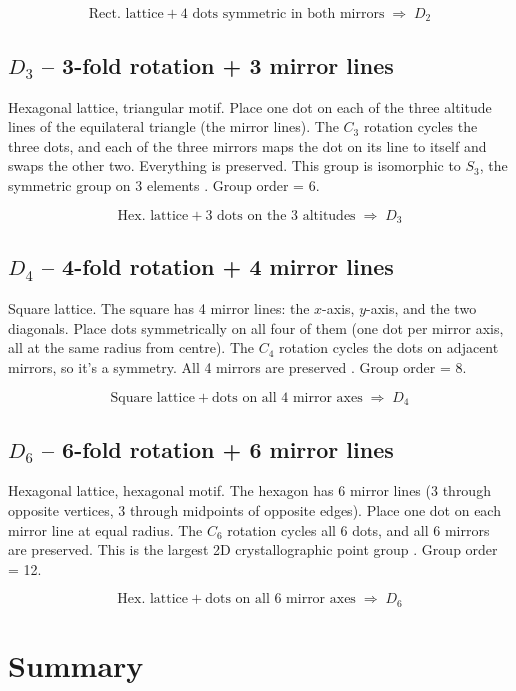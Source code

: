 \documentclass[12pt,a4paper]{article}
\begin{document}
\[
\boxed{\text{Rect. lattice} + \text{4 dots symmetric in both mirrors} \;\Rightarrow\; D_2}
\]

\subsection*{$D_3$ -- 3-fold rotation + 3 mirror lines}

Hexagonal lattice, triangular motif. Place one dot on each of the three altitude lines
of the equilateral triangle (the mirror lines). The $C_3$ rotation cycles the three
dots, and each of the three mirrors maps the dot on its line to itself and swaps the
other two. Everything is preserved. This group is isomorphic to $S_3$, the symmetric
group on 3 elements \cite{Burns1990, Bradley1972}. Group order = 6.

\[
\boxed{\text{Hex. lattice} + \text{3 dots on the 3 altitudes} \;\Rightarrow\; D_3}
\]

\subsection*{$D_4$ -- 4-fold rotation + 4 mirror lines}

Square lattice. The square has 4 mirror lines: the $x$-axis, $y$-axis, and the two
diagonals. Place dots symmetrically on all four of them (one dot per mirror axis,
all at the same radius from centre). The $C_4$ rotation cycles the dots on adjacent
mirrors, so it's a symmetry. All 4 mirrors are preserved \cite{Ashcroft1976}. Group order = 8.

\[
\boxed{\text{Square lattice} + \text{dots on all 4 mirror axes} \;\Rightarrow\; D_4}
\]

\subsection*{$D_6$ -- 6-fold rotation + 6 mirror lines}

Hexagonal lattice, hexagonal motif. The hexagon has 6 mirror lines (3 through
opposite vertices, 3 through midpoints of opposite edges). Place one dot on each
mirror line at equal radius. The $C_6$ rotation cycles all 6 dots, and all 6 mirrors
are preserved. This is the largest 2D crystallographic point group \cite{Hammond2015}. Group order = 12.

\[
\boxed{\text{Hex. lattice} + \text{dots on all 6 mirror axes} \;\Rightarrow\; D_6}
\]

\newpage
\section*{Summary}
\end{document}

